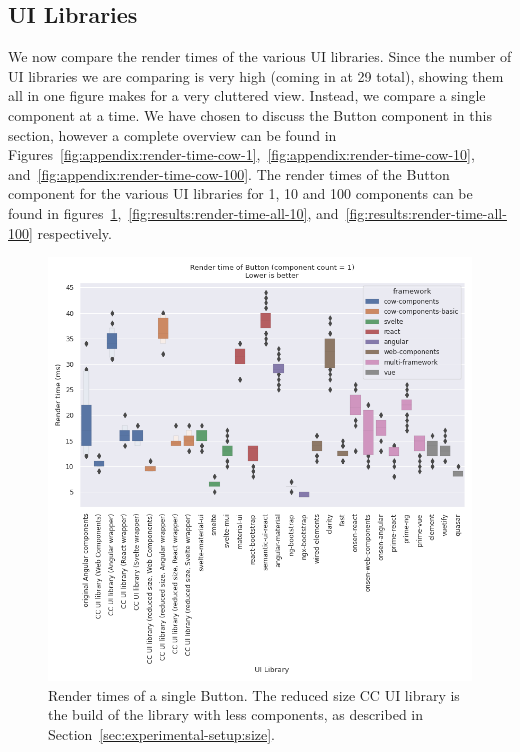 \subsection{UI Libraries}
We now compare the render times of the various UI libraries. Since the number of UI libraries we are comparing is very high (coming in at 29 total), showing them all in one figure makes for a very cluttered view. Instead, we compare a single component at a time. We have chosen to discuss the Button component in this section, however a complete overview can be found in Figures~\ref{fig:appendix:render-time-cow-1},~\ref{fig:appendix:render-time-cow-10}, and~\ref{fig:appendix:render-time-cow-100}. The render times of the Button component for the various UI libraries for 1, 10 and 100 components can be found in figures~\ref{fig:results:render-time-all-1},~\ref{fig:results:render-time-all-10}, and~\ref{fig:results:render-time-all-100} respectively.

\begin{figure}[htbp]
  \centering{}
  \includegraphics[width=0.8\columnwidth]{plots/render-time-all-1-Button.png}
  \caption{Render times of a single Button. The reduced size CC UI library is the build of the library with less components, as described in Section~\ref{sec:experimental-setup:size}.}
  \label{fig:results:render-time-all-1}
  \centering
\end{figure}

